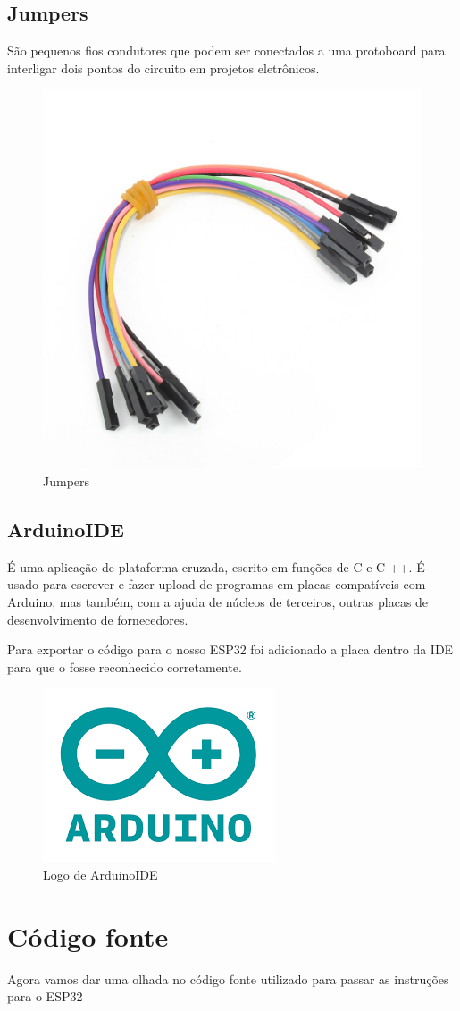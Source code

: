 \documentclass[12pt]{article}
\begin{document}
\subsection{Jumpers}
São pequenos fios condutores que podem ser conectados a uma protoboard
para interligar dois pontos do circuito em projetos eletrônicos.

\begin{figure}[ht]
  \centering
  \includegraphics[width=.45\textwidth]{Images/jumpers.jpg}
  \caption{Jumpers}
  \label{fig:exampleJumpers}
\end{figure}
\subsection{ArduinoIDE}
É uma aplicação de plataforma cruzada, escrito em funções de C e C ++. É usado para escrever e fazer upload de
programas em placas compatíveis com Arduino, mas também, com a ajuda de núcleos de terceiros, outras placas de
desenvolvimento de fornecedores.

Para exportar o código para o nosso ESP32 foi adicionado a placa dentro da IDE para que o fosse reconhecido corretamente.

\begin{figure}[ht]
  \centering
  \includegraphics[width=.45\textwidth]{Images/arduinoIDELogo.png}
  \caption{Logo de ArduinoIDE}
  \label{fig:exampleArduinoIDE}
\end{figure}

\section{Código fonte}
Agora vamos dar uma olhada no código fonte utilizado para passar as instruções para o ESP32

\end{document}
